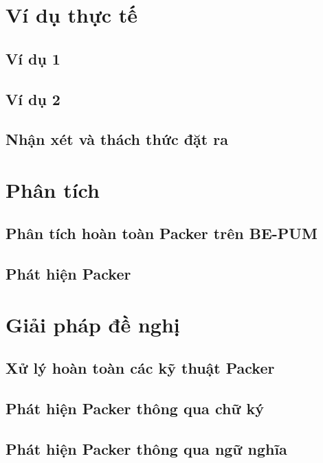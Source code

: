 \section{Ví dụ thực tế}

\subsection{Ví dụ 1}

\subsection{Ví dụ 2}

\subsection{Nhận xét và thách thức đặt ra}

\section{Phân tích}

\subsection {Phân tích hoàn toàn Packer trên BE-PUM}

\subsection {Phát hiện Packer}

\section{Giải pháp đề nghị}

\subsection {Xử lý hoàn toàn các kỹ thuật Packer}

\subsection {Phát hiện Packer thông qua chữ ký}

\subsection {Phát hiện Packer thông qua ngữ nghĩa}